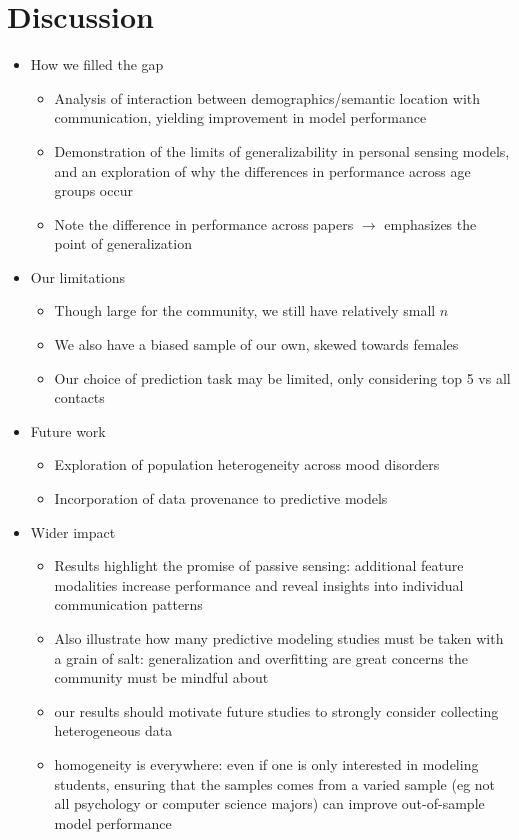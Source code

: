 \documentclass[acmlarge]{acmart}
\begin{document}
\section{Discussion}
\label{sec:discussion}

\begin{itemize}
    \item How we filled the gap
    \begin{itemize}
        \item Analysis of interaction between demographics/semantic location with communication, yielding improvement in model performance
        \item Demonstration of the limits of generalizability in personal sensing models, and an exploration of why the differences in performance across age groups occur
        \item Note the difference in performance across papers $\to$ emphasizes the point of generalization
    \end{itemize}
    \item Our limitations
    \begin{itemize}
        \item Though large for the community, we still have relatively small $n$ 
        \item We also have a biased sample of our own, skewed towards females
        \item Our choice of prediction task may be limited, only considering top 5 vs all contacts
    \end{itemize}
    \item Future work
    \begin{itemize}
        \item Exploration of population heterogeneity across mood disorders
        \item Incorporation of data provenance to predictive models
    \end{itemize}
    \item Wider impact
    \begin{itemize}
        \item Results highlight the promise of passive sensing: additional feature modalities increase performance and reveal insights into individual communication patterns
        \item Also illustrate how many predictive modeling studies must be taken with a grain of salt: generalization and overfitting are great concerns the community must be mindful about
        \item our results should motivate future studies to strongly consider collecting heterogeneous data
        \item homogeneity is everywhere: even if one is only interested in modeling students, ensuring that the samples comes from a varied sample (eg not all psychology or computer science majors) can improve out-of-sample model performance
    \end{itemize}
\end{itemize}
\end{document}
